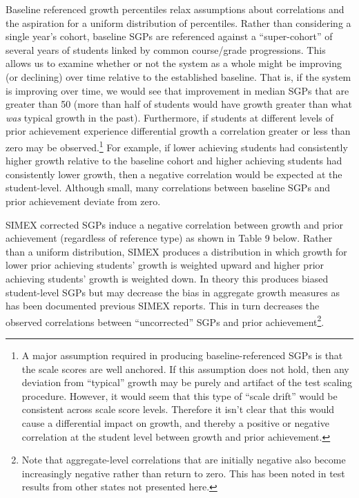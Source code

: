 \documentclass[12pt]{article}
\begin{document}
Baseline referenced growth percentiles relax assumptions about
correlations and the aspiration for a uniform distribution of
percentiles. Rather than considering a single year's cohort, baseline
SGPs are referenced against a ``super-cohort'' of several years of
students linked by common course/grade progressions. This allows us to
examine whether or not the system as a whole might be improving (or
declining) over time relative to the established baseline. That is, if
the system is improving over time, we would see that improvement in
median SGPs that are greater than 50 (more than half of students would
have growth greater than what \emph{was} typical growth in the past).
Furthermore, if students at different levels of prior achievement
experience differential growth a correlation greater or less than zero
may be observed.\footnote{A major assumption required in producing
  baseline-referenced SGPs is that the scale scores are well anchored.
  If this assumption does not hold, then any deviation from ``typical''
  growth may be purely and artifact of the test scaling procedure.
  However, it would seem that this type of ``scale drift'' would be
  consistent across scale score levels. Therefore it isn't clear that
  this would cause a differential impact on growth, and thereby a
  positive or negative correlation at the student level between growth
  and prior achievement.} For example, if lower achieving students had
consistently higher growth relative to the baseline cohort and higher
achieving students had consistently lower growth, then a negative
correlation would be expected at the student-level. Although small, many
correlations between baseline SGPs and prior achievement deviate from
zero.

SIMEX corrected SGPs induce a negative correlation between growth and
prior achievement (regardless of reference type) as shown in Table 9
below. Rather than a uniform distribution, SIMEX produces a distribution
in which growth for lower prior achieving students' growth is weighted
upward and higher prior achieving students' growth is weighted down. In
theory this produces biased student-level SGPs but may decrease the bias
in aggregate growth measures as has been documented previous SIMEX
reports. This in turn decreases the observed correlations between
``uncorrected'' SGPs and prior achievement\footnote{Note that
  aggregate-level correlations that are initially negative also become
  increasingly negative rather than return to zero. This has been noted
  in test results from other states not presented here.}.
\end{document}
